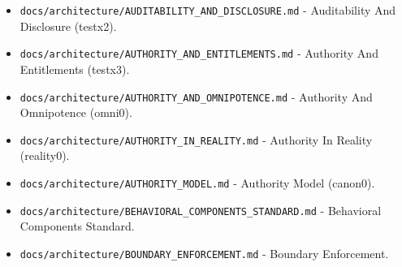 \documentclass[9pt,a4paper,openany]{book}
\begin{document}
\begin{itemize}
\item \texttt{docs/\allowbreak{}architecture/\allowbreak{}AUDITABILITY\_\allowbreak{}AND\_\allowbreak{}DISCLOSURE.\allowbreak{}md} -\allowbreak{} Auditability And Disclosure (testx2).\allowbreak{}
\end{itemize}

\begin{itemize}
\item \texttt{docs/\allowbreak{}architecture/\allowbreak{}AUTHORITY\_\allowbreak{}AND\_\allowbreak{}ENTITLEMENTS.\allowbreak{}md} -\allowbreak{} Authority And Entitlements (testx3).\allowbreak{}
\end{itemize}

\begin{itemize}
\item \texttt{docs/\allowbreak{}architecture/\allowbreak{}AUTHORITY\_\allowbreak{}AND\_\allowbreak{}OMNIPOTENCE.\allowbreak{}md} -\allowbreak{} Authority And Omnipotence (omni0).\allowbreak{}
\end{itemize}

\begin{itemize}
\item \texttt{docs/\allowbreak{}architecture/\allowbreak{}AUTHORITY\_\allowbreak{}IN\_\allowbreak{}REALITY.\allowbreak{}md} -\allowbreak{} Authority In Reality (reality0).\allowbreak{}
\end{itemize}

\begin{itemize}
\item \texttt{docs/\allowbreak{}architecture/\allowbreak{}AUTHORITY\_\allowbreak{}MODEL.\allowbreak{}md} -\allowbreak{} Authority Model (canon0).\allowbreak{}
\end{itemize}

\begin{itemize}
\item \texttt{docs/\allowbreak{}architecture/\allowbreak{}BEHAVIORAL\_\allowbreak{}COMPONENTS\_\allowbreak{}STANDARD.\allowbreak{}md} -\allowbreak{} Behavioral Components Standard.\allowbreak{}
\end{itemize}

\begin{itemize}
\item \texttt{docs/\allowbreak{}architecture/\allowbreak{}BOUNDARY\_\allowbreak{}ENFORCEMENT.\allowbreak{}md} -\allowbreak{} Boundary Enforcement.\allowbreak{}
\end{itemize}
\end{document}
